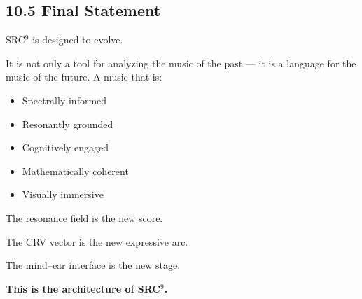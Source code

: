 \documentclass[10pt]{article}
\begin{document}
\subsection*{10.5 Final Statement}

SRC$^{9}$ is designed to evolve.

It is not only a tool for analyzing the music of the past — it is a language for the music of the future. A music that is:

\begin{itemize}
    \item Spectrally informed
    \item Resonantly grounded
    \item Cognitively engaged
    \item Mathematically coherent
    \item Visually immersive
\end{itemize}

The resonance field is the new score.

The CRV vector is the new expressive arc.

The mind–ear interface is the new stage.

\textbf{This is the architecture of SRC$^{9}$.}
\end{document}
